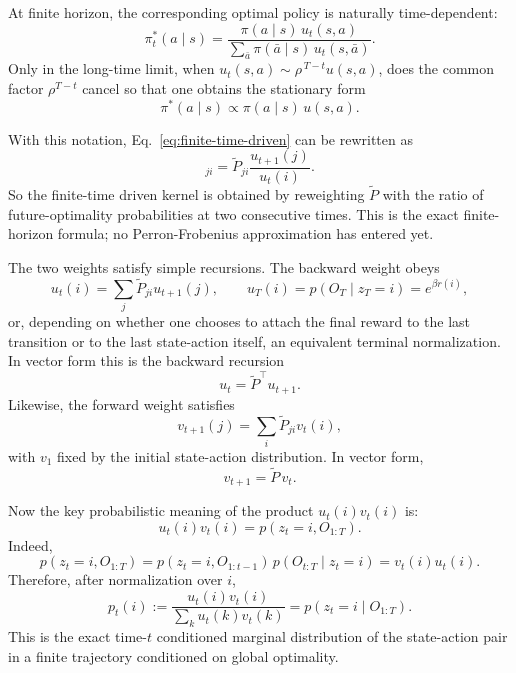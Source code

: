 \documentclass[11pt]{article}
\begin{document}
At finite horizon, the corresponding optimal policy is naturally time-dependent:
\begin{equation}
    \pi_t^*(a\mid s)
    =
    \frac{\pi(a\mid s)\,u_t(s,a)}
    {\sum_{\bar a}\pi(\bar a\mid s)\,u_t(s,\bar a)}.
\end{equation}
Only in the long-time limit, when \(u_t(s,a)\sim \rho^{\,T-t}u(s,a)\), does the common factor
\(\rho^{T-t}\) cancel so that one obtains the stationary form
\begin{equation}
    \pi^*(a\mid s)
    \propto
    \pi(a\mid s)\,u(s,a).
\end{equation}

With this notation, Eq.~\eqref{eq:finite-time-driven} can be rewritten as
\begin{equation}
    [P_d^{(t,T)}]_{ji}
    =
    \widetilde{P}_{ji}\frac{u_{t+1}(j)}{u_t(i)}.
\end{equation}
So the finite-time driven kernel is obtained by reweighting \(\widetilde P\) with the ratio of
future-optimality probabilities at two consecutive times. This is the exact finite-horizon
formula; no Perron-Frobenius approximation has entered yet.

The two weights satisfy simple recursions. The backward weight obeys
\begin{equation}
    u_t(i)=\sum_j \widetilde{P}_{ji}u_{t+1}(j),
    \qquad
    u_T(i)=p(O_T\mid z_T=i)=e^{\beta r(i)},
\end{equation}
or, depending on whether one chooses to attach the final reward to the last transition or to
the last state-action itself, an equivalent terminal normalization. In vector form this is the
backward recursion
\begin{equation}
    u_t = \widetilde P^\top u_{t+1}.
\end{equation}
Likewise, the forward weight satisfies
\begin{equation}
    v_{t+1}(j)=\sum_i \widetilde{P}_{ji}v_t(i),
\end{equation}
with \(v_1\) fixed by the initial state-action distribution. In vector form,
\begin{equation}
    v_{t+1}=\widetilde P\, v_t.
\end{equation}

Now the key probabilistic meaning of the product \(u_t(i)v_t(i)\) is:
\begin{equation}
    u_t(i)v_t(i)
    =
    p(z_t=i,O_{1:T}).
\end{equation}
Indeed,
\begin{equation}
    p(z_t=i,O_{1:T})
    =
    p(z_t=i,O_{1:t-1})\,p(O_{t:T}\mid z_t=i)
    =
    v_t(i)u_t(i).
\end{equation}
Therefore, after normalization over \(i\),
\begin{equation}
    p_t(i)
    :=
    \frac{u_t(i)v_t(i)}{\sum_k u_t(k)v_t(k)}
    =
    p(z_t=i\mid O_{1:T}).
\end{equation}
This is the exact time-\(t\) conditioned marginal distribution of the state-action pair in a
finite trajectory conditioned on global optimality.
\end{document}
